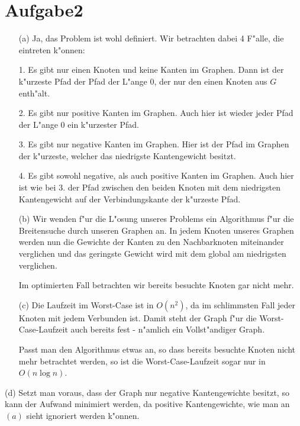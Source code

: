 \documentclass{article}
\begin{document}
\section*{Aufgabe2}
\begin{enumerate}
\item[(a)] Ja, das Problem ist wohl definiert. Wir betrachten dabei 4 F"alle,
die eintreten k"onnen:

1. Es gibt nur einen Knoten und keine Kanten im Graphen. Dann ist der k"urzeste
Pfad der Pfad der L"ange \(0\), der nur den einen Knoten aus \(G\) enth"alt.

2. Es gibt nur positive Kanten im Graphen. Auch hier ist wieder jeder Pfad der
L"ange \(0\) ein k"urzester Pfad.

3. Es gibt nur negative Kanten im Graphen. Hier ist der Pfad im Graphen der
k"urzeste, welcher das niedrigste Kantengewicht besitzt.

4. Es gibt sowohl negative, als auch positive Kanten im Graphen. Auch hier ist
wie bei 3. der Pfad zwischen den beiden Knoten mit dem niedrigsten Kantengewicht
auf der Verbindungskante der k"urzeste Pfad.

\item[(b)] Wir wenden f"ur die L"osung unseres Problems ein Algorithmus f"ur
die Breitensuche durch unseren Graphen an. In jedem Knoten unseres Graphen
werden nun die Gewichte der Kanten zu den Nachbarknoten miteinander
verglichen und das geringste Gewicht wird mit dem global am niedrigsten
verglichen.

Im optimierten Fall betrachten wir bereits besuchte Knoten gar nicht mehr.

\item[(c)] Die Laufzeit im Worst-Case ist in \(O(n^2)\), da im schlimmsten Fall
jeder Knoten mit jedem Verbunden ist. Damit steht der Graph f"ur die
Worst-Case-Laufzeit auch bereits fest - n"amlich ein Vollst"andiger Graph.

Passt man den Algorithmus etwas an, so dass bereits besuchte Knoten nicht mehr
betrachtet werden, so ist die Worst-Case-Laufzeit sogar nur in \(O(n \log n)\).
\end{enumerate}

\item[(d)] Setzt man voraus, dass der Graph nur negative Kantengewichte besitzt,
so kann der Aufwand minimiert werden, da positive Kantengewichte, wie man an
\((a)\) sieht ignoriert werden k"onnen.
\end{document}
